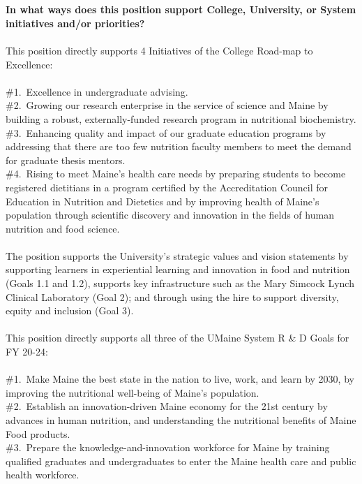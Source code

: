 \documentclass[11pt]{article}
\begin{document}
\\~\\
\vfill
\newpage
\noindent\textbf{\rmfamily In what ways does this position support College, University, or System initiatives and/or priorities?}
\\~\\
This position directly supports 4 Initiatives of the College Road-map to Excellence:\\~\\ 
\#1.~Excellence in undergraduate advising.\\ 
\#2.~Growing our research enterprise in the service of science and Maine by building a robust, externally-funded research program in nutritional biochemistry.\\
\#3.~Enhancing quality and impact of our graduate education programs by addressing that there are too few nutrition faculty members to meet the demand for graduate thesis mentors.\\
\#4.~Rising to meet Maine's health care needs by preparing students to become registered dietitians in a program certified by the Accreditation Council for Education in Nutrition and Dietetics and by improving health of Maine's population through scientific discovery and innovation in the fields of human nutrition and food science.
\\~\\
The position supports the University's strategic values and vision statements by supporting learners in experiential learning and innovation in food and nutrition (Goals 1.1 and 1.2), supports key infrastructure such as the Mary Simcock Lynch Clinical Laboratory (Goal 2); and through using the hire to support diversity, equity and inclusion (Goal 3).
\\~\\
This position directly supports all three of the UMaine System R \& D Goals for FY 20-24:\\~\\
\#1.~Make Maine the best state in the nation to live, work, and learn by 2030, by improving the nutritional well-being of Maine's population. \\
\#2.~Establish an innovation-driven Maine economy for the 21st century by advances in human nutrition, and understanding the nutritional benefits of Maine Food products.\\
\#3.~Prepare the knowledge-and-innovation workforce for Maine by training qualified graduates and undergraduates to enter the Maine health care and public health workforce.\\~\\
\end{document}
